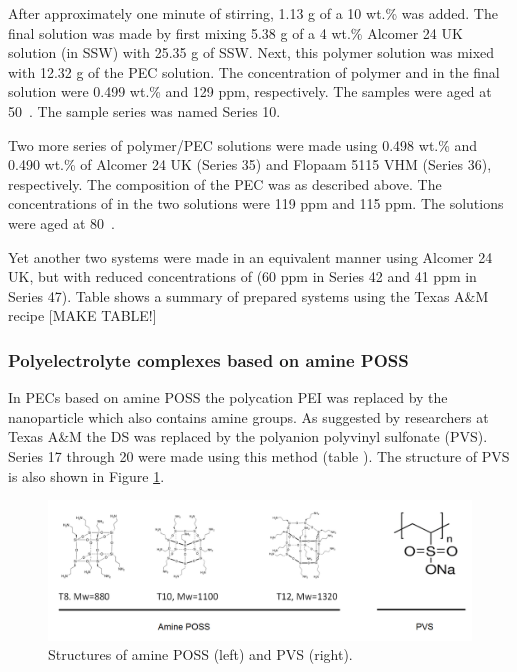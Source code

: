After approximately one minute of stirring, 1.13 g of a 10 wt.\%  was added. The final solution was made by first mixing 5.38 g of a 4 wt.\% Alcomer 24 UK solution (in SSW) with 25.35 g of SSW. Next, this polymer solution was mixed with 12.32 g of the PEC solution. The concentration of polymer and  in the final solution were 0.499 wt.\% and 129 ppm, respectively. The samples were aged at 50~\celsius. The sample series was named Series 10.

Two more series of polymer/PEC solutions were made using 0.498 wt.\% and 0.490 wt.\% of Alcomer 24 UK (Series 35) and Flopaam 5115 VHM (Series 36), respectively. The composition of the PEC was as described above. The concentrations of  in the two solutions were 119 ppm and 115 ppm. The solutions were aged at 80~\celsius. 

Yet another two systems were made in an equivalent manner using Alcomer 24 UK, but with reduced concentrations of  (60 ppm in Series 42 and 41 ppm in Series 47). Table \what shows a summary of prepared systems using the Texas A\&M recipe [MAKE TABLE!\what]

\subsubsection{Polyelectrolyte complexes based on amine POSS}

In PECs based on amine POSS the polycation PEI was replaced by the nanoparticle which also contains amine groups. As suggested by researchers at Texas A\&M the DS was replaced by the polyanion polyvinyl sulfonate (PVS). Series 17 through 20 were made using this method (table \what). The structure of PVS is also shown in Figure \ref{fig:pvs}.

\begin{figure}[h]
    \centering
    \includegraphics[width=\textwidth]{img/fig/pvs.png}
    \caption{Structures of amine POSS (left) and PVS (right).}
    \label{fig:pvs}
\end{figure}


